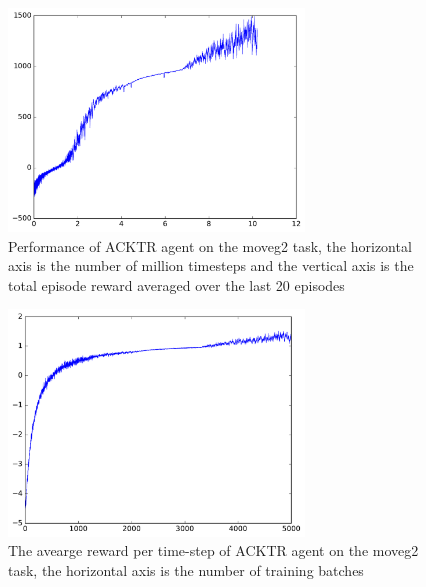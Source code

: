 \begin{figure}[!htbp]
	\includegraphics[width=0.7\textwidth]{images/rec_stat_moveg2.pdf}
	\centering
	\caption{Performance of ACKTR agent on the moveg2 task, the horizontal axis is the number of million timesteps and the vertical axis is the total episode reward averaged over the last 20 episodes}\label{rec_stat_moveg2}
\end{figure}

\begin{figure}[!htbp]
	\includegraphics[width=0.7\textwidth]{images/rec_stat_moveg2_meanrt.pdf}
	\centering
	\caption{The avearge reward per time-step of ACKTR agent on the moveg2 task, the horizontal axis is the number of training batches}\label{rec_stat_moveg2_meanrt}
\end{figure}

